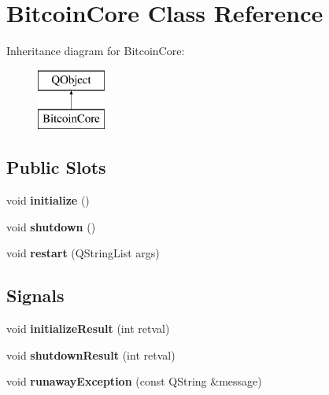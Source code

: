 \hypertarget{class_bitcoin_core}{}\section{Bitcoin\+Core Class Reference}
\label{class_bitcoin_core}
Inheritance diagram for Bitcoin\+Core\+:\begin{figure}[H]
\begin{center}
\leavevmode
\includegraphics[height=2.000000cm]{class_bitcoin_core}
\end{center}
\end{figure}
\subsection*{Public Slots}
\begin{DoxyCompactItemize}
\item 
\mbox{\label{class_bitcoin_core_af34ca069cda1d4362dcc109b4397fb62}} 
void {\bfseries initialize} ()
\item 
\mbox{\label{class_bitcoin_core_a94f3f4622ba698e321f3a2e0e686129f}} 
void {\bfseries shutdown} ()
\item 
\mbox{\label{class_bitcoin_core_ac2271844c89ebc4c611e7617ce6202e3}} 
void {\bfseries restart} (Q\+String\+List args)
\end{DoxyCompactItemize}
\subsection*{Signals}
\begin{DoxyCompactItemize}
\item 
\mbox{\label{class_bitcoin_core_a60731c85f462a0fce478334b6f4bad3c}} 
void {\bfseries initialize\+Result} (int retval)
\item 
\mbox{\label{class_bitcoin_core_a42f562bccf2546b161a74be30a879032}} 
void {\bfseries shutdown\+Result} (int retval)
\item 
\mbox{\label{class_bitcoin_core_a72c0e056da09226343525a6a85c54e5a}} 
void {\bfseries runaway\+Exception} (const Q\+String \&message)
\end{DoxyCompactItemize}


